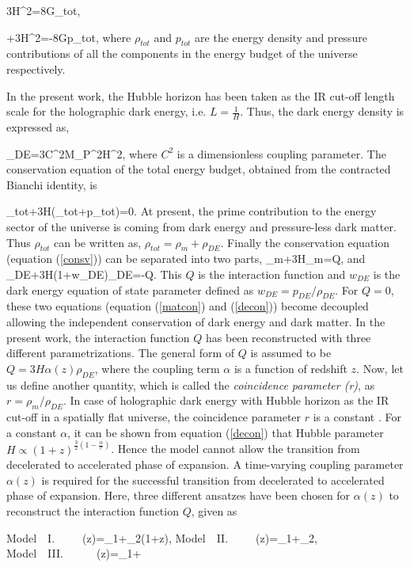 \documentclass[11pt]{article}
\begin{document}
\be
3H^2=8\pi G\rho_{tot},
\ee

+3H^2=-8\pi Gp_{tot},
\ee
where $\rho_{tot}$ and $p_{tot}$ are the energy density and pressure contributions of all the components in the energy budget of the universe respectively.

In the present work, the Hubble horizon has been taken as the IR cut-off length scale for the holographic dark energy, i.e. $L=\frac{1}{H}$.
Thus, the dark energy density is expressed as,

\be
\rho_{DE}=3C^2M_P^2H^2,
\ee
where $C^2$ is a dimensionless coupling parameter. The conservation equation of the total energy budget, obtained from the contracted Bianchi identity, is

\be
\dot{\rho}_{tot}+3H(\rho_{tot}+p_{tot})=0.
\label{consv}
\ee
At present, the prime contribution to the energy sector of the universe is coming from dark energy and pressure-less dark matter. Thus $\rho_{tot}$ can be written as, $\rho_{tot} = \rho_m + \rho_{DE}$. Finally the conservation equation (equation (\ref{consv})) can be separated into two parts, 
\be
\dot{\rho}_m+3H\rho_m=Q,
\label{matcon}
\ee 
and
\be
\dot{\rho}_{DE}+3H(1+w_{DE})\rho_{DE}=-Q.
\label{decon}
\ee
This $Q$ is the interaction function and $w_{DE}$ is the dark energy equation of state parameter defined as $w_{DE}=p_{DE}/\rho_{DE}$. For $Q=0$, these two equations (equation (\ref{matcon}) and (\ref{decon})) become decoupled allowing the independent conservation of dark energy and dark matter. In the present work, the interaction function $Q$ has been reconstructed with three different parametrizations. The general form of $Q$ is assumed to be $Q=3H\alpha(z)\rho_{DE}$, where the coupling term $\alpha $ is a function of redshift $z$. Now, let us define another quantity, which is called the {\it coincidence parameter (r)}, as $r=\rho_{m}/\rho_{DE}$. In case of holographic dark energy with Hubble horizon as the IR cut-off in a spatially flat universe, the coincidence parameter $r$ is a constant \cite{senpav}. For a constant $\alpha$, it can be shown from equation (\ref{decon}) that Hubble parameter $H\propto(1+z)^{\frac{3}{2}(1-\frac{\alpha}{r})}$. Hence the model cannot allow the transition from decelerated to accelerated phase of expansion. A time-varying coupling parameter $\alpha(z)$ is required for the successful transition from decelerated to accelerated phase of expansion. Here, three different ansatzes have been chosen for $\alpha(z)$ to reconstruct the interaction function $Q$, given as

\be
Model~~I.~~~~~\alpha(z)=\alpha_1+\alpha_2(1+z),
\label{a1}
\ee   
\be
Model~~II.~~~~~\alpha(z)=\alpha_1+\alpha_2,
\label{a2}
\ee  
\be
Model~~III.~~~~~~\alpha(z)=\alpha_1+
\label{a3}
\ee 
\end{document}
